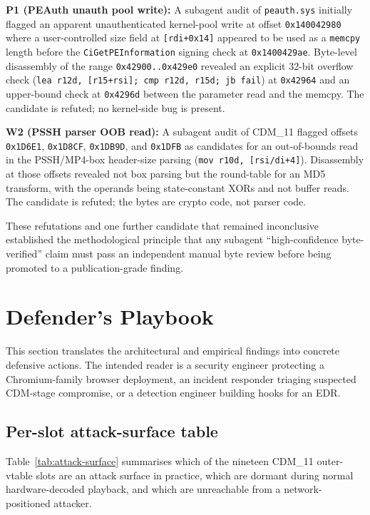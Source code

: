 \documentclass[11pt,letterpaper]{article}
\let\oldsection\section
\renewcommand{\section}{\clearpage\oldsection}
\begin{document}
\textbf{P1 (PEAuth unauth pool write):} A subagent audit of
\texttt{peauth.sys} initially flagged an apparent unauthenticated
kernel-pool write at offset \texttt{0x140042980} where a
user-controlled size field at \texttt{[rdi+0x14]} appeared to be
used as a \texttt{memcpy} length before the
\texttt{CiGetPEInformation} signing check at
\texttt{0x1400429ae}. Byte-level disassembly of the range
\texttt{0x42900..0x429e0} revealed an explicit 32-bit overflow
check (\texttt{lea r12d, [r15+rsi]; cmp r12d, r15d; jb fail}) at
\texttt{0x42964} and an upper-bound check at \texttt{0x4296d}
between the parameter read and the memcpy. The candidate is
refuted; no kernel-side bug is present.

\textbf{W2 (PSSH parser OOB read):} A subagent audit of CDM\_11
flagged offsets \texttt{0x1D6E1}, \texttt{0x1D8CF},
\texttt{0x1DB9D}, and \texttt{0x1DFB} as candidates for an
out-of-bounds read in the PSSH/MP4-box header-size parsing
(\texttt{mov r10d, [r{si/di}+4]}). Disassembly at those offsets
revealed not box parsing but the round-table for an MD5 transform,
with the operands being state-constant XORs and not buffer reads.
The candidate is refuted; the bytes are crypto code, not parser
code.

These refutations and one further candidate that remained
inconclusive established the methodological principle that any
subagent ``high-confidence byte-verified'' claim must pass an
independent manual byte review before being promoted to a
publication-grade finding.

\section{Defender's Playbook}
\label{sec:defender}

This section translates the architectural and empirical findings
into concrete defensive actions. The intended reader is a security
engineer protecting a Chromium-family browser deployment, an
incident responder triaging suspected CDM-stage compromise, or a
detection engineer building hooks for an EDR.

\subsection{Per-slot attack-surface table}

Table~\ref{tab:attack-surface} summarises which of the nineteen
CDM\_11 outer-vtable slots are an attack surface in practice,
which are dormant during normal hardware-decoded playback, and
which are unreachable from a network-positioned attacker.
\end{document}
